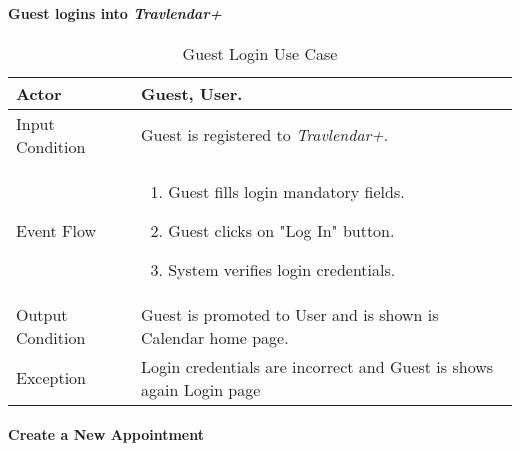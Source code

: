 	\paragraph{Guest logins into \textit{Travlendar+}}\label{login_useCase}
	
		\begin{table}[H]
			\begin{tabular}{| l | p{} | }
				\hline
				\hline
				Actor	&		Guest, User. \\
				\hline
				Input Condition		&		Guest is registered to  \textit{Travlendar+}. \\
				\hline
				Event Flow		&		\begin{enumerate}
													\item Guest fills login mandatory fields.
													\item Guest clicks on "Log In" button.
													\item System verifies login credentials.
												\end{enumerate} \\
				\hline
				Output Condition		&		Guest is promoted to User and is shown is Calendar home page. \\
				\hline		
				Exception		&		Login credentials are incorrect and Guest is shows again Login page\\
				\hline
				\hline
			\end{tabular}
			\caption{Guest Login Use Case}
		\end{table}

	\paragraph{Create a New Appointment} \label{createEvent_useCase}
	
